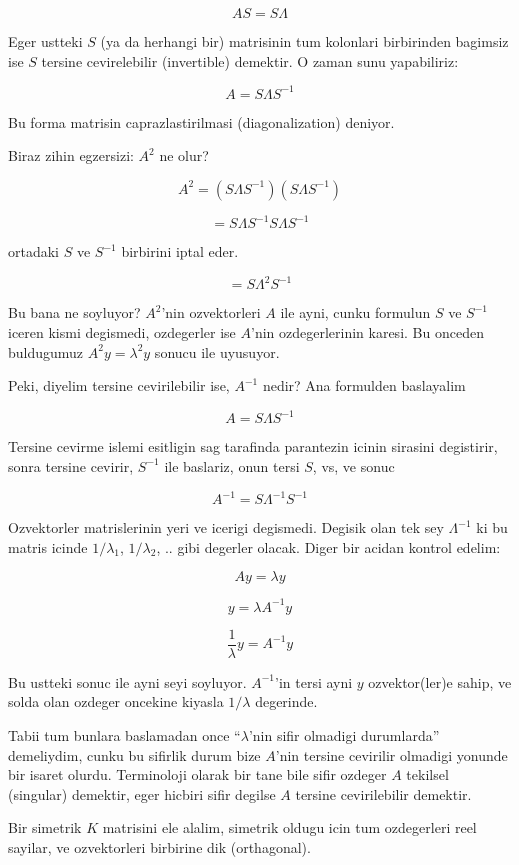 \documentclass[12pt,fleqn]{article}\usepackage{../common}
\begin{document}
\[ AS = S\Lambda \]

Eger ustteki $S$ (ya da herhangi bir) matrisinin tum kolonlari birbirinden
bagimsiz ise $S$ tersine cevirelebilir (invertible) demektir. O zaman sunu
yapabiliriz:

\[ A = S \Lambda S^{-1} \]

Bu forma matrisin caprazlastirilmasi (diagonalization) deniyor. 

Biraz zihin egzersizi: $A^2$ ne olur? 

\[ A^2 = (S \Lambda S^{-1})(S \Lambda S^{-1}) \]

\[ = S \Lambda S^{-1}S \Lambda S^{-1} \]

ortadaki $S$ ve $S^{-1}$ birbirini iptal eder. 

\[ = S \Lambda^2 S^{-1} \]

Bu bana ne soyluyor? $A^2$'nin ozvektorleri $A$ ile ayni, cunku formulun
$S$ ve $S^{-1}$ iceren kismi degismedi, ozdegerler ise $A$'nin
ozdegerlerinin karesi. Bu onceden buldugumuz $A^2y = \lambda^2y$ sonucu ile uyusuyor.

Peki, diyelim tersine cevirilebilir ise, $A^{-1}$ nedir? Ana formulden baslayalim

\[ A = S \Lambda S^{-1} \]

Tersine cevirme islemi esitligin sag tarafinda parantezin icinin sirasini
degistirir, sonra tersine cevirir, $S^{-1}$ ile baslariz, onun tersi $S$,
vs, ve sonuc

\[ A^{-1} = S \Lambda^{-1}S^{-1} \]

Ozvektorler matrislerinin yeri ve icerigi degismedi. Degisik olan tek sey
$\Lambda^{-1}$ ki bu matris icinde $1/\lambda_1$, $1/\lambda_2$, .. gibi
degerler olacak. Diger bir acidan kontrol edelim:

\[ Ay = \lambda y \]

\[ y = \lambda A^{-1} y \]

\[ \frac{1}{\lambda}y =  A^{-1} y \]

Bu ustteki sonuc ile ayni seyi soyluyor. $A^{-1}$'in tersi ayni $y$
ozvektor(ler)e sahip, ve solda olan ozdeger oncekine kiyasla $1/\lambda$
degerinde. 

Tabii tum bunlara baslamadan once ``$\lambda$'nin sifir olmadigi
durumlarda'' demeliydim, cunku bu sifirlik durum bize $A$'nin tersine
cevirilir olmadigi yonunde bir isaret olurdu. Terminoloji olarak bir tane
bile sifir ozdeger $A$ tekilsel (singular) demektir, eger hicbiri sifir
degilse $A$ tersine cevirilebilir demektir. 

Bir simetrik $K$ matrisini ele alalim, simetrik oldugu icin tum ozdegerleri
reel sayilar, ve ozvektorleri birbirine dik (orthagonal). 
\end{document}
